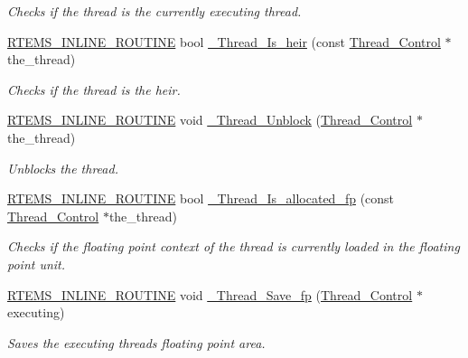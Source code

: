 \begin{DoxyCompactItemize}
\begin{DoxyCompactList}\small\item\em Checks if the thread is the currently executing thread. \end{DoxyCompactList}\item 
\mbox{\hyperlink{group__RTEMSScoreBaseDefs_gac216239df231d5dbd15e3520b0b9313f}{R\+T\+E\+M\+S\+\_\+\+I\+N\+L\+I\+N\+E\+\_\+\+R\+O\+U\+T\+I\+NE}} bool \mbox{\hyperlink{group__RTEMSScoreThread_ga1c0c8b33dbdf05215d0656c251045bec}{\+\_\+\+Thread\+\_\+\+Is\+\_\+heir}} (const \mbox{\hyperlink{struct__Thread__Control}{Thread\+\_\+\+Control}} $\ast$the\+\_\+thread)
\begin{DoxyCompactList}\small\item\em Checks if the thread is the heir. \end{DoxyCompactList}\item 
\mbox{\hyperlink{group__RTEMSScoreBaseDefs_gac216239df231d5dbd15e3520b0b9313f}{R\+T\+E\+M\+S\+\_\+\+I\+N\+L\+I\+N\+E\+\_\+\+R\+O\+U\+T\+I\+NE}} void \mbox{\hyperlink{group__RTEMSScoreThread_ga1234634f1d75c8c0864c5727b526f9a3}{\+\_\+\+Thread\+\_\+\+Unblock}} (\mbox{\hyperlink{struct__Thread__Control}{Thread\+\_\+\+Control}} $\ast$the\+\_\+thread)
\begin{DoxyCompactList}\small\item\em Unblocks the thread. \end{DoxyCompactList}\item 
\mbox{\hyperlink{group__RTEMSScoreBaseDefs_gac216239df231d5dbd15e3520b0b9313f}{R\+T\+E\+M\+S\+\_\+\+I\+N\+L\+I\+N\+E\+\_\+\+R\+O\+U\+T\+I\+NE}} bool \mbox{\hyperlink{group__RTEMSScoreThread_ga798bc92d66cc45b20ceb5b06049340d6}{\+\_\+\+Thread\+\_\+\+Is\+\_\+allocated\+\_\+fp}} (const \mbox{\hyperlink{struct__Thread__Control}{Thread\+\_\+\+Control}} $\ast$the\+\_\+thread)
\begin{DoxyCompactList}\small\item\em Checks if the floating point context of the thread is currently loaded in the floating point unit. \end{DoxyCompactList}\item 
\mbox{\hyperlink{group__RTEMSScoreBaseDefs_gac216239df231d5dbd15e3520b0b9313f}{R\+T\+E\+M\+S\+\_\+\+I\+N\+L\+I\+N\+E\+\_\+\+R\+O\+U\+T\+I\+NE}} void \mbox{\hyperlink{group__RTEMSScoreThread_gaa10e7acfe1b219ad258d5342bca2bc63}{\+\_\+\+Thread\+\_\+\+Save\+\_\+fp}} (\mbox{\hyperlink{struct__Thread__Control}{Thread\+\_\+\+Control}} $\ast$executing)
\begin{DoxyCompactList}\small\item\em Saves the executing thread\textquotesingle{}s floating point area. \end{DoxyCompactList}\item 

\end{DoxyCompactItemize}
